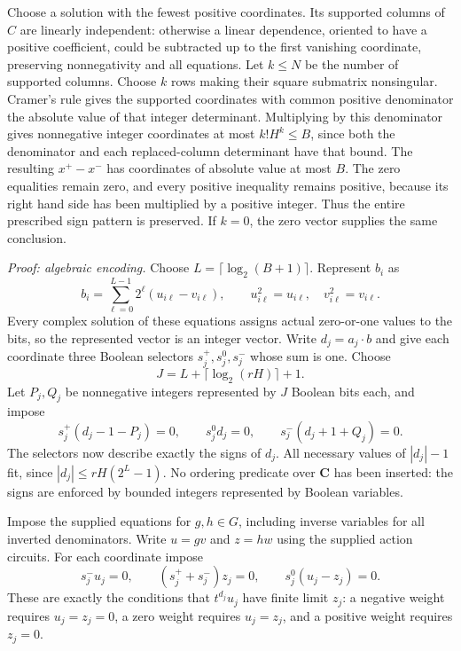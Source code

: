 Choose a solution with the fewest positive coordinates. Its supported
columns of $C$ are linearly independent: otherwise a linear dependence,
oriented to have a positive coefficient, could be subtracted up to the
first vanishing coordinate, preserving nonnegativity and all equations.
Let $k\le N$ be the number of supported columns. Choose $k$ rows making
their square submatrix nonsingular. Cramer's rule gives the supported
coordinates with common positive denominator the absolute value of that
integer determinant. Multiplying by this denominator gives nonnegative
integer coordinates at most $k!H^k\le B$, since both the denominator and
each replaced-column determinant have that bound. The resulting
$x^+-x^-$ has coordinates of absolute value at most $B$. The zero
equalities remain zero, and every positive inequality remains positive,
because its right hand side has been multiplied by a positive integer.
Thus the entire prescribed sign pattern is preserved. If $k=0$, the
zero vector supplies the same conclusion.

\emph{Proof: algebraic encoding.} Choose
$L=\lceil\log_2(B+1)\rceil$. Represent $b_i$ as
\[
           b_i=\sum_{\ell=0}^{L-1}2^\ell
                         (u_{i\ell}-v_{i\ell}),
        \qquad u_{i\ell}^2=u_{i\ell},\quad
               v_{i\ell}^2=v_{i\ell}.
\]
Every complex solution of these equations assigns actual zero-or-one
values to the bits, so the represented vector is an integer vector.
Write $d_j=a_j\cdot b$ and give each coordinate three Boolean selectors
$s_j^+,s_j^0,s_j^-$ whose sum is one. Choose
\[
       J=L+\lceil\log_2(rH)\rceil+1.
\]
Let $P_j,Q_j$ be nonnegative integers represented by $J$ Boolean bits
each, and impose
\[
 s_j^+(d_j-1-P_j)=0,\qquad
 s_j^0d_j=0,\qquad s_j^-(d_j+1+Q_j)=0.
\]
The selectors now describe exactly the signs of $d_j$. All necessary
values of $|d_j|-1$ fit, since $|d_j|\le rH(2^L-1)$.
No ordering predicate over $\mathbf C$ has been inserted: the signs
are enforced by bounded integers represented by Boolean variables.

Impose the supplied equations for $g,h\in G$, including inverse
variables for all inverted denominators. Write $u=gv$ and $z=hw$ using
the supplied action circuits. For each coordinate impose
\[
              s_j^-u_j=0,\qquad
              (s_j^++s_j^-)z_j=0,\qquad
              s_j^0(u_j-z_j)=0.
\]
These are exactly the conditions that $t^{d_j}u_j$ have finite limit
$z_j$: a negative weight requires $u_j=z_j=0$, a zero weight requires
$u_j=z_j$, and a positive weight requires $z_j=0$.

